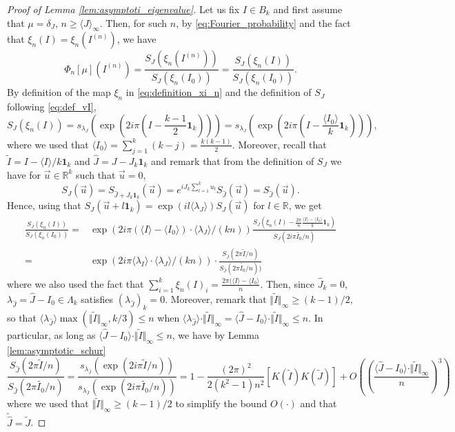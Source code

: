 \documentclass[10pt,11pt]{amsart}%
\begin{document}
\begin{proof}[Proof of Lemma \ref{lem:asymptoti_eigenvalue}]
Let us fix $I\in B_{k}$ and first assume that $\mu=\delta_J$, $n\geq \langle J\rangle_{\infty}$. Then, for such $n$, by \eqref{eq:Fourier_probability} and the fact that $\xi_{n}(I)=\xi_{n}(I^{(n)})$, we have 
$$\Phi_{n}[\mu](I^{(n)})=\frac{S_{J}(\xi_{n}(I^{(n)}))}{S_{J}(\xi_{n}(I_0))}=\frac{S_{J}(\xi_{n}(I))}{S_{J}(\xi_{n}(I_0))}.$$
By definition of the map $\xi_n$ in \eqref{eq:definition_xi_n} and the definition of $S_J$ following \eqref{eq:def_vI},
$$S_{J}(\xi_{n}(I))=s_{\lambda_{J}}\left(\exp\left(2i\pi  \left(I-\frac{k-1}{2}\mathbf{1}_k\right)\right)\right)=s_{\lambda_{J}}\left(\exp\left(2i\pi \left(I-\frac{\langle I_0\rangle}{k}\mathbf{1}_k\right)\right)\right),$$
where we used that $\langle I_0\rangle=\sum_{j=1}^k(k-j)=\frac{k(k-1)}{2}$. Moreover, recall that $\tilde{I}=I-\langle I\rangle/k\mathbf{1}_k$ and $\hat{J}=J-J_{k}\mathbf{1}_k$ and remark that from the definition of $S_J$ we have for $\vec{u}\in \mathbb{R}^k$ such that $\vec{u}=0$,
$$S_{J}(\vec{u})=S_{\hat{J}+J_k\mathbf{1}_k}(\vec{u})=e^{iJ_k\sum_{l=1}^ku_l}S_{\hat{J}}(\vec{u})=S_{\hat{J}}(\vec{u}).$$
Hence, using that $S_J(\vec{u}+l\mathbf{1}_k)=\exp(i l\langle \lambda_J\rangle)S_{J}(\vec{u})$ for $l\in \mathbb{R}$, we get 
\begin{align}
\frac{S_{J}(\xi_{n}(I))}{S_{J}(\xi_{n}(I_0))}=&\exp(2i\pi (\langle I\rangle-\langle I_0\rangle)\cdot\langle \lambda_J\rangle/(kn))\frac{S_{J}\left(\xi_{n}(I)-\frac{2\pi}{n}\frac{\langle I\rangle-\langle I_0\rangle}{k}\mathbf{1}_k\right)}{S_{J}\left(2i\pi\tilde{I_0}/n\right)}\nonumber\\
=&\exp(2i\pi \langle \lambda_I\rangle\cdot\langle \lambda_J\rangle/(kn))\cdot \frac{S_{\hat{J}}(2\pi\tilde{I}/n)}{S_{\hat{J}}(2\pi\tilde{I_0}/n))}\label{eq:invariance_character_centered}
\end{align}
where we also used the fact that $\sum_{i=1}^k\xi_n(I)_i=\frac{2\pi(\langle I\rangle-\langle I_0\rangle}{n}$. Then, since $\hat{J}_k=0$, $\lambda_{\hat{J}}=\hat{J}-I_0\in \Lambda_{k}$ satisfies $\left(\lambda_{\hat{J}}\right)_k=0$. Moreover, remark that $\Vert \tilde{I}\Vert_\infty\geq (k-1)/2$, so that $\langle \lambda_{\hat{J}}\rangle\max(\Vert \tilde{I}\Vert_\infty,k/3)\leq n$ when $\langle \lambda_{\hat{J}}\rangle\cdot\Vert \tilde{I}\Vert_\infty=\langle  \hat{J}-I_0\rangle\cdot\Vert \tilde{I}\Vert_\infty\leq n$. In particular, as long as $\langle  \hat{J}-I_0\rangle\cdot\Vert \tilde{I}\Vert_\infty\leq n$, we have  by Lemma \ref{lem:asymptotic_schur} 
\begin{equation}
\frac{S_{\hat{J}}(2\pi \tilde{I}/n)}{S_{\hat{J}}(2\pi\tilde{I_0}/n)}=\frac{s_{\lambda_{\hat{J}}}\left(\exp\left(2i\pi\tilde{I}/n\right)\right)}{s_{\lambda_{\hat{J}}}\left(\exp\left(2i\pi\tilde{I_0}/n\right)\right)}=1
-\frac{(2\pi)^2}{2(k^2-1)n^2}\left[K(\tilde{I})K(\tilde{J})\right]+O\left(\left(\frac{\langle  \hat{J}-I_0\rangle\cdot \Vert \tilde{I}\Vert_\infty}{n}\right)^3\right)\label{eq:asymptotic_eigenvalue_main_contribution}
\end{equation}
where we used that $\Vert \tilde{I}\Vert_\infty\geq (k-1)/2$ to simplify the bound $O(\cdot)$ and that $\widetilde{\hat{J}}=\widetilde{J}$.



\end{proof}
\end{document}
